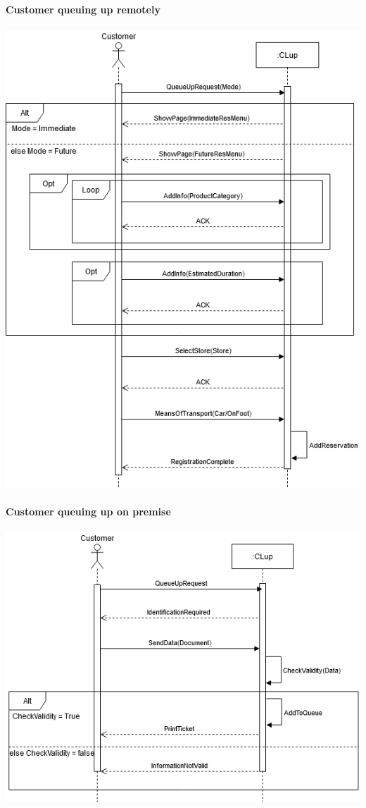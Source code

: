 \paragraph{Customer queuing up remotely}
\begin{flushleft}
	\includegraphics[scale=0.5]{Images/UseCase4Diagram.png}
\end{flushleft}
\newpage
\paragraph{Customer queuing up on premise}
\begin{flushleft}
	\includegraphics[scale=0.5]{Images/UseCase5Diagram.png}
\end{flushleft}
